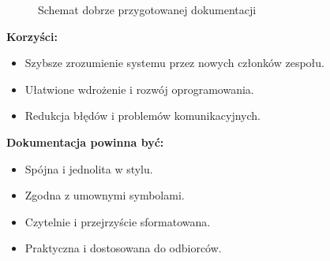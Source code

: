 \documentclass[a4paper,12pt]{article}
\begin{document}
\begin{figure}[ht]
    \centering
    \caption{Schemat dobrze przygotowanej dokumentacji}
\end{figure}

\vspace{0.5cm}

\textbf{Korzyści:}
\begin{itemize}
    \item Szybsze zrozumienie systemu przez nowych członków zespołu.
    \item Ułatwione wdrożenie i rozwój oprogramowania.
    \item Redukcja błędów i problemów komunikacyjnych.
\end{itemize}

\textbf{Dokumentacja powinna być:}
\begin{itemize}
    \item Spójna i jednolita w stylu.
    \item Zgodna z umownymi symbolami.
    \item Czytelnie i przejrzyście sformatowana.
    \item Praktyczna i dostosowana do odbiorców.
\end{itemize}
\end{document}
